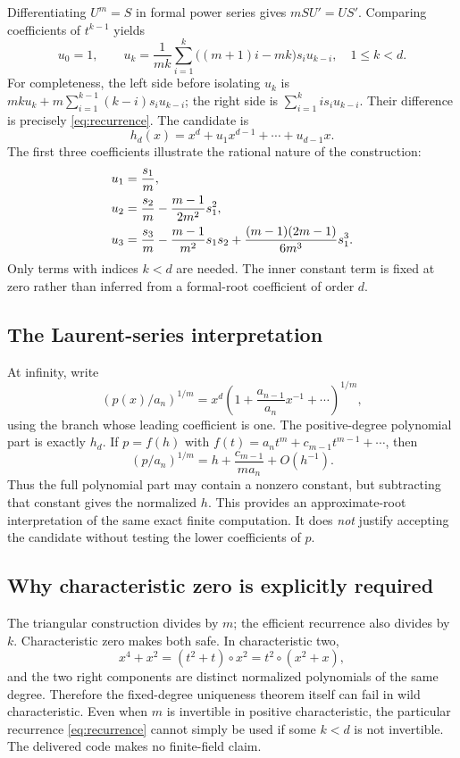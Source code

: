 \documentclass[11pt,a4paper]{article}
\numberwithin{equation}{section}
\theoremstyle{definition}
\theoremstyle{remark}
\begin{document}
Differentiating $U^m=S$ in formal power series gives
$mSU'=US'$. Comparing coefficients of $t^{k-1}$ yields
\begin{equation}
 \boxed{\quad
 u_0=1,\qquad
 u_k=\frac{1}{mk}\sum_{i=1}^{k}
       \bigl((m+1)i-mk\bigr)s_i u_{k-i},
 \quad 1\le k<d.\quad}
 \label{eq:recurrence}
\end{equation}
For completeness, the left side before isolating $u_k$ is
$mku_k+m\sum_{i=1}^{k-1}(k-i)s_i u_{k-i}$; the right side is
$\sum_{i=1}^k i s_i u_{k-i}$. Their difference is precisely
\eqref{eq:recurrence}. The candidate is
\begin{equation}
 h_d(x)=x^d+u_1x^{d-1}+\cdots+u_{d-1}x.
 \label{eq:hd}
\end{equation}
The first three coefficients illustrate the rational nature of the construction:
\begin{align}
 u_1&=\frac{s_1}{m},\notag\\
 u_2&=\frac{s_2}{m}-\frac{m-1}{2m^2}s_1^2,\notag\\
 u_3&=\frac{s_3}{m}-\frac{m-1}{m^2}s_1s_2
       +\frac{(m-1)(2m-1)}{6m^3}s_1^3.
 \label{eq:firstcoeffs}
\end{align}
Only terms with indices $k<d$ are needed. The inner constant term is fixed
at zero rather than inferred from a formal-root coefficient of order $d$.

\subsection{The Laurent-series interpretation}
At infinity, write
\[
 \left(p(x)/a_n\right)^{1/m}
 =x^d\left(1+\frac{a_{n-1}}{a_n}x^{-1}+\cdots\right)^{1/m},
\]
using the branch whose leading coefficient is one. The positive-degree
polynomial part is exactly $h_d$. If $p=f(h)$ with
$f(t)=a_nt^m+c_{m-1}t^{m-1}+\cdots$, then
\[
 \left(p/a_n\right)^{1/m}
 =h+\frac{c_{m-1}}{ma_n}+O(h^{-1}).
\]
Thus the full polynomial part may contain a nonzero constant, but subtracting
that constant gives the normalized $h$. This provides an approximate-root
interpretation of the same exact finite computation. It does \emph{not}
justify accepting the candidate without testing the lower coefficients of
$p$.

\subsection{Why characteristic zero is explicitly required}
The triangular construction divides by $m$; the efficient recurrence also
divides by $k$. Characteristic zero makes both safe. In characteristic two,
\[
 x^4+x^2=(t^2+t)\circ x^2=t^2\circ(x^2+x),
\]
and the two right components are distinct normalized polynomials of the same
degree. Therefore the fixed-degree uniqueness theorem itself can fail in wild
characteristic. Even when $m$ is invertible in positive characteristic, the
particular recurrence \eqref{eq:recurrence} cannot simply be used if some
$k<d$ is not invertible. The delivered code makes no finite-field claim.
\end{document}
